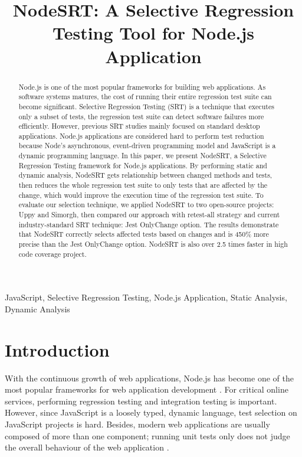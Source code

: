 \documentclass[10pt, conference]{IEEEtran}
\begin{document}
\title{NodeSRT: A Selective Regression Testing Tool for Node.js Application}

\author{
}

\maketitle

\begin{abstract}
Node.js is one of the most popular frameworks for building web applications. As software systems 
matures, the cost of running their entire regression test suite can become significant. 
Selective Regression Testing (SRT) is a technique that executes only a subset of tests, the regression test suite can detect software failures more efficiently. 
However, previous SRT studies mainly focused on standard desktop applications. Node.js applications are 
considered hard to perform test reduction because Node's asynchronous, event-driven programming model and 
JavaScript is a dynamic programming language. 
In this paper, we present NodeSRT, a Selective Regression Testing framework for Node.js applications. 
By performing static and dynamic analysis, NodeSRT gets relationship between changed methods and tests, 
then reduces the whole regression test suite to only tests that are 
affected by the change, which would improve the execution time of the regression test suite. 
To evaluate our selection technique, we applied NodeSRT to two open-source projects: Uppy and Simorgh, 
then compared our approach with retest-all strategy and current industry-standard SRT technique: Jest 
OnlyChange option. The results demonstrate that NodeSRT correctly selects affected tests based on 
changes and is 450\% more precise than the Jest OnlyChange option. NodeSRT is also over 2.5 times faster in 
high code coverage project.
    
\end{abstract}

\begin{IEEEkeywords}
JavaScript, Selective Regression Testing, Node.js Application, Static Analysis, Dynamic Analysis
\end{IEEEkeywords}

\section{Introduction}
With the continuous growth of web applications, Node.js has become one of the most popular frameworks 
for web application development \cite{b16}. For critical online services, performing regression testing and integration testing is important. However, 
since JavaScript is a loosely typed, dynamic language, test 
selection on JavaScript projects is hard. Besides, modern web applications are usually composed of 
more than one component; running unit tests only does not judge the overall behaviour of the web 
application \cite{b8}. 
\end{document}
